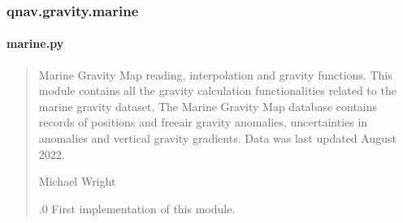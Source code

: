 \documentclass[letterpaper,10pt,english]{sphinxmanual}
\begin{document}
\sphinxstepscope


\subsubsection{qnav.gravity.marine}
\label{\detokenize{modules/gravity/marine:module-qnav.gravity.marine}}\label{\detokenize{modules/gravity/marine:qnav-gravity-marine}}\label{\detokenize{modules/gravity/marine::doc}}

\paragraph{marine.py}
\label{\detokenize{modules/gravity/marine:marine-py}}\begin{quote}\begin{description}
\sphinxAtStartPar
Marine Gravity Map reading, interpolation and gravity functions.
This module contains all the gravity calculation functionalities related
to the marine gravity dataset. The Marine Gravity Map database contains
records of positions and free\sphinxhyphen{}air gravity anomalies, uncertainties in
anomalies and vertical gravity gradients. Data was last updated
August 2022.

\sphinxAtStartPar
Michael Wright \sphinxhyphen{} 

.0 \sphinxhyphen{} First implementation of this module.

\end{description}\end{quote}
\end{document}
